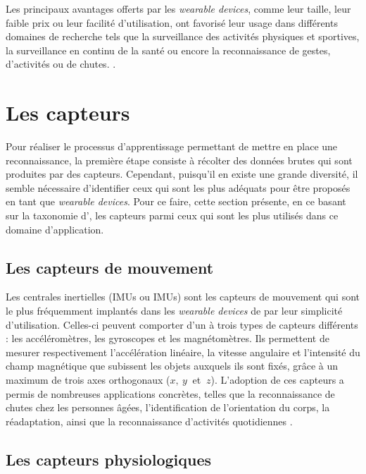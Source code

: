 Les principaux avantages offerts par les \textit{wearable devices}, comme leur taille, leur faible prix ou leur facilité d'utilisation, ont favorisé leur usage dans différents domaines de recherche tels que la surveillance des activités physiques et sportives, la surveillance en continu de la santé ou encore la reconnaissance de gestes, d'activités ou de chutes. \citep{Seon-WooLee2002, Istepanian2011, Garcia-Ceja2014, Bayat2014, YuanJieFan2014, Gao2014, Nielsen2014, Adib2015, Davis2016, Khan2016, Chapron2018}.

\section{Les capteurs}

Pour réaliser le processus d'apprentissage permettant de mettre en place une reconnaissance, la première étape consiste à récolter des données brutes qui sont produites par des capteurs. Cependant, puisqu'il en existe une grande diversité, il semble nécessaire d'identifier ceux qui sont les plus adéquats pour être proposés en tant que \textit{wearable devices}. Pour ce faire, cette section présente, en ce basant sur la taxonomie d'\cite{Acampora2013}, les capteurs parmi ceux qui sont les plus utilisés dans ce domaine d'application.

\subsection{Les capteurs de mouvement}

Les centrales inertielles (\aclp{IMU} ou \acsp{IMU}) sont les capteurs de mouvement qui sont le plus fréquemment implantés dans les \textit{wearable devices} de par leur simplicité d'utilisation. Celles-ci peuvent comporter d'un à trois types de capteurs différents : les accéléromètres, les gyroscopes et les magnétomètres. Ils permettent de mesurer respectivement l'accélération linéaire, la vitesse angulaire et l'intensité du champ magnétique que subissent les objets auxquels ils sont fixés, grâce à un maximum de trois axes orthogonaux ($x,\: y\: $ et $\: z$). L'adoption de ces capteurs a permis de nombreuses applications concrètes, telles que la reconnaissance de chutes chez les personnes âgées, l'identification de l'orientation du corps, la réadaptation, ainsi que la reconnaissance d'activités quotidiennes \citep{Seon-WooLee2002, Garcia-Ceja2014, Bayat2014, Gao2014, Davis2016, Chapron2018}.

\subsection{Les capteurs physiologiques}

